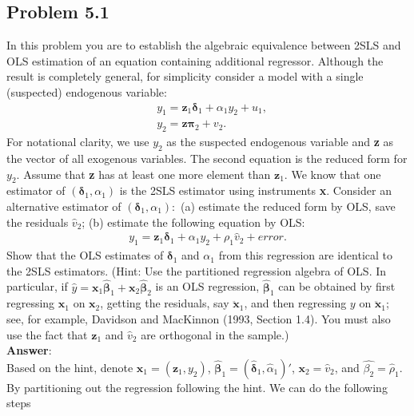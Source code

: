 \documentclass[10pt]{article}
\begin{document}
\subsection*{Problem 5.1}
In this problem you are to establish the algebraic equivalence between 2SLS and OLS estimation of an equation containing additional regressor. Although the result is completely general, for simplicity consider a model with a single (suspected) endogenous variable:
\begin{align*}
    &y_1=\textbf{z}_1\pmb{\delta}_1+\alpha_1y_2+u_1,\\
    &y_2=\textbf{z}\pmb{\pi}_2+v_2.
\end{align*}
For notational clarity, we use $y_2$ as the suspected endogenous variable and \textbf{z} as the vector of all exogenous variables. The second equation is the reduced form for $y_2.$ Assume that \textbf{z} has at least one more element than $\textbf{z}_1.$
We know that one estimator of $(\pmb{\delta}_1,\alpha_1)$ is the 2SLS estimator using instruments \textbf{x}. Consider an alternative estimator of $(\pmb{\delta}_1,\alpha_1):$ (a) estimate the reduced form by OLS, save the residuals $\hat{v}_2$; (b) estimate the following equation by OLS:
\begin{align}
    y_1=\textbf{z}_1\pmb{\delta}_1+\alpha_1y_2+\rho_1\hat{v}_2+error. \tag{5.52} \label{5.52}
\end{align}
Show that the OLS estimates of $\pmb{\delta}_1$ and $\alpha_1$ from this regression are identical to the 2SLS estimators. (Hint: Use the partitioned regression algebra of OLS. In particular, if $\hat{y}=\textbf{x}_1\hat{\pmb{\beta}}_1+\textbf{x}_2\hat{\pmb{\beta}}_2$ is an OLS regression, $\hat{\pmb{\beta}}_1$ can be obtained by first regressing $\textbf{x}_1$ on $\textbf{x}_2$, getting the residuals, say $\ddot{\textbf{x}}_1$, and then regressing $y$ on $\ddot{\textbf{x}}_1$; see, for example, Davidson and MacKinnon (1993, Section 1.4). You must also use the fact that $\textbf{z}_1$ and $\hat{v}_2$ are orthogonal in the sample.)\\ 
\textbf{Answer}: \\
Based on the hint, denote $\textbf{x}_1=(\textbf{z}_1,y_2)$, $\hat{\pmb{\beta}}_1=(\hat{\pmb{\delta}}_1,\hat{\alpha}_1)'$, $\textbf{x}_2=\hat{v}_2$, and $\hat{\beta_2}=\hat{\rho}_1$. By partitioning out the regression following the hint. We can do the following steps
\end{document}
